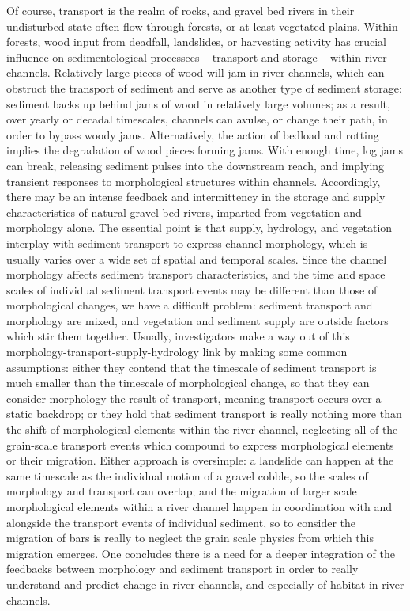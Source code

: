 \documentclass{article}
\begin{document}
Of course, transport is the realm of rocks, and gravel bed rivers in their undisturbed state often flow through forests, or at least vegetated plains. 
Within forests, wood input from deadfall, landslides, or harvesting activity has crucial influence on sedimentological processees -- transport and storage -- within river channels. 
Relatively large pieces of wood will jam in river channels, which can obstruct the transport of sediment and serve as another type of sediment storage: sediment backs up behind jams of wood in relatively large volumes; as a result, over yearly or decadal timescales, channels can avulse, or change their path, in order to bypass woody jams. Alternatively, the action of bedload and rotting implies the degradation of wood pieces forming jams. 
With enough time, log jams can break, releasing sediment pulses into the downstream reach, and implying transient responses to morphological structures within channels. 
Accordingly, there may be an intense feedback and intermittency in the storage and supply characteristics of natural gravel bed rivers, imparted from vegetation and morphology alone. 
The essential point is that supply, hydrology, and vegetation interplay with sediment transport to express channel morphology, which is usually varies over a wide set of spatial and temporal scales. 
Since the channel morphology affects sediment transport characteristics, and the time and space scales of individual sediment transport events may be different than those of morphological changes, we have a difficult problem: sediment transport and morphology are mixed, and vegetation and sediment supply are outside factors which stir them together. 
Usually, investigators make a way out of this morphology-transport-supply-hydrology link by making some common assumptions: either they contend that the timescale of sediment transport is much smaller than the timescale of morphological change, so that they can consider morphology the result of transport, meaning transport occurs over a static backdrop; or they hold that sediment transport is really nothing more than the shift of morphological elements within the river channel, neglecting all of the grain-scale transport events which compound to express morphological elements or their migration. 
Either approach is oversimple: a landslide can happen at the same timescale as the individual motion of a gravel cobble, so the scales of morphology and transport can overlap; and the migration of larger scale morphological elements within a river channel happen in coordination with and alongside the transport events of individual sediment, so to consider the migration of bars is really to neglect the grain scale physics from which this migration emerges. 
One concludes there is a need for a deeper integration of the feedbacks between morphology and sediment transport in order to really understand and predict change in river channels, and especially of habitat in river channels.  
\end{document}
